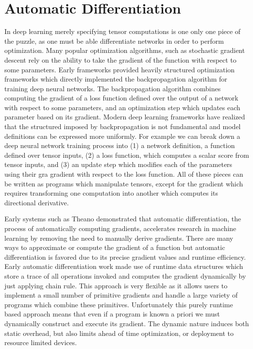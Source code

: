 \chapter{Automatic Differentiation}
\label{ch:ad}

In deep learning merely specifying tensor computations is
  one only one piece of the puzzle, as one must be able
  differentiate networks in order to perform optimization.
Many popular optimization algorithms,
  such as stochastic gradient descent
  rely on the ability to take
  the gradient of the function with
  respect to some parameters.
Early frameworks provided heavily structured optimization frameworks
  which directly implemented the backpropagation algorithm for training
  deep neural networks.
The backpropagation algorithm combines
  computing the gradient of a loss function defined over the
  output of a network with respect to some parameters, and an
  optimization step which updates each parameter based on its
  gradient.
Modern deep learning frameworks have realized that the
  structured imposed by backpropagation is not fundamental
  and model definitions can be expressed more uniformly.
For example we can break down a deep neural network training
  process into (1) a network definition, a function defined over tensor inputs,
  (2) a loss function, which computes a scalar score from tensor
  inputs, and (3) an update step which modifies each of the parameters using their gra
  gradient with respect to the loss function.
All of these pieces can be written as programs which manipulate tensors,
  except for the gradient which requires transforming
  one computation into another which computes its directional derivative.

Early systems such as Theano demonstrated that automatic
  differentiation, the process of automatically computing gradients,
  accelerates research in machine learning by removing the need to manually
  derive gradients.
There are many ways to approximate or compute the gradient of a function
  but automatic differentiation is favored due to its precise gradient
  values and runtime efficiency.
Early automatic differentiation work made use of runtime data structures
  which store a trace of all operations invoked and computes the gradient
  dynamically by just applying chain rule.
This approach is very flexible as it allows users to implement a small number
  of primitive gradients and handle a large variety of programs which combine
  these primitives.
Unfortunately this purely runtime based approach means that even if a program
  is known a priori we must dynamically construct and execute its gradient.
The dynamic nature induces both static overhead, but also limits ahead of time
  optimization, or deployment to resource limited devices.

